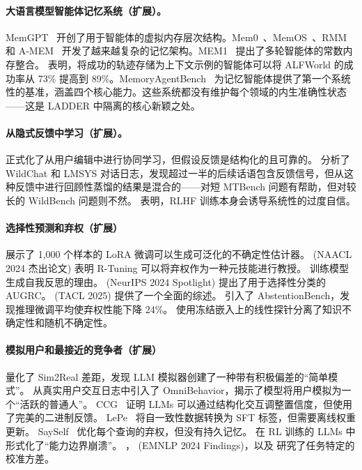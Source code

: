 \documentclass[11pt,a4paper,fontset=fandol]{ctexart}
\begin{document}
\paragraph{大语言模型智能体记忆系统（扩展）。}
MemGPT~\citep{packer2023memgpt} 开创了用于智能体的虚拟内存层次结构。Mem0~\citep{mem02025}、MemOS~\citep{li2025memos}、RMM~\citep{tan2025rmm} 和 A-MEM~\citep{xu2025amem} 开发了越来越复杂的记忆架构。MEM1~\citep{mem1_2026} 提出了多轮智能体的常数内存整合。 \citet{sarukkai2025selfgen} 表明，将成功的轨迹存储为上下文示例的智能体可以将 ALFWorld 的成功率从 73\% 提高到 89\%。MemoryAgentBench~\citep{hu2026memoryagent} 为记忆智能体提供了第一个系统性的基准，涵盖四个核心能力。这些系统都没有维护每个领域的内生准确性状态——这是 LADDER 中隔离的核心新颖之处。

\paragraph{从隐式反馈中学习（扩展）。}
\citet{tucker2024coactive} 正式化了从用户编辑中进行协同学习，但假设反馈是结构化的且可靠的。 \citet{liu2025implicit} 分析了 WildChat 和 LMSYS 对话日志，发现超过一半的后续话语包含反馈信号，但从这种反馈中进行回顾性蒸馏的结果是混合的——对短 MTBench 问题有帮助，但对较长的 WildBench 问题则不然。 \citet{leng2025taming} 表明，RLHF 训练本身会诱导系统性的过度自信。

\paragraph{选择性预测和弃权（扩展）}
\citet{kapoor2024taught} 展示了 1,000 个样本的 LoRA 微调可以生成可泛化的不确定性估计器。 \citet{diao2024rtuning} (NAACL 2024 杰出论文) 表明 R-Tuning 可以将弃权作为一种元技能进行教授。 \citet{xu2024sayself} 训练模型生成自我反思的理由。 \citet{traub2024augrc} (NeurIPS 2024 Spotlight) 提出了用于选择性分类的 AUGRC。 \citet{li2025abstention} (TACL 2025) 提供了一个全面的综述。 \citet{kirichenko2025abstentionbench} 引入了 AbstentionBench，发现推理微调平均使弃权性能下降 24\%。 \citet{ahdritz2024knowable} 使用冻结嵌入上的线性探针分离了知识不确定性和随机不确定性。

\paragraph{模拟用户和最接近的竞争者（扩展）}
\citet{zhou2026sim2real} 量化了 Sim2Real 差距，发现 LLM 模拟器创建了一种带有积极偏差的“简单模式”。 \citet{omnibehavior2025} 从真实用户交互日志中引入了 OmniBehavior，揭示了模型将用户模拟为一个“活跃的普通人”。 CCG~\citep{fang2025ccg} 证明 LLMs 可以通过结构化交互调整置信度，但使用了完美的二进制反馈。 LePe~\citep{han2024lepe} 将自一致性数据转换为 SFT 标签，但需要离线权重更新。 SaySelf~\citep{xu2024sayself} 优化每个查询的弃权，但没有持久记忆。 \citet{dong2025rlplus} 在 RL 训练的 LLMs 中形式化了“能力边界崩溃”。 \citet{shen2024thermometer}，\citet{chen2024reconfidencing} (EMNLP 2024 Findings)，以及 \citet{manggala2025qacal} 研究了任务特定的校准方差。
\end{document}

